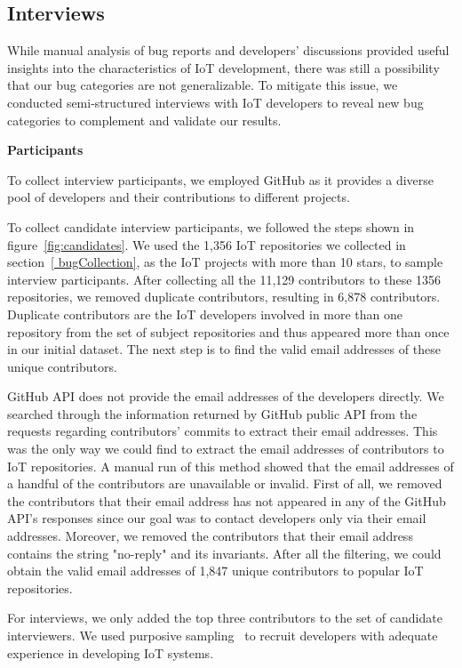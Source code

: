 \subsection{Interviews} \label{interviews4Bug}
 While manual analysis of bug reports and developers' discussions provided useful insights into the characteristics of IoT development, there was still a possibility that our bug categories are not generalizable. To mitigate this issue, we conducted semi-structured interviews with IoT developers to reveal new bug categories to complement and validate our results. 

\textbf{Participants} 

To collect interview participants, we employed GitHub as it provides a diverse pool of developers and their contributions to different projects.

To collect candidate interview participants, we followed the steps shown in figure~\autoref{fig:candidates}. We used the 1,356 IoT repositories we collected in section~\autoref{ bugCollection}, as the IoT projects with more than 10 stars, to sample interview participants. After collecting all the 11,129 contributors to these 1356 repositories, we removed duplicate contributors, resulting in 6,878 contributors. Duplicate contributors are the IoT developers involved in more than one repository from the set of subject repositories and thus appeared more than once in our initial dataset. The next step is to find the valid email addresses of these unique contributors.


GitHub API does not provide the email addresses of the developers directly. We searched through the information returned by GitHub public API from the requests regarding contributors' commits to extract their email addresses. This was the only way we could find to extract the email addresses of contributors to IoT repositories.  A manual run of this method showed that the email addresses of a handful of the contributors are unavailable or invalid. First of all, we removed the contributors that their email address has not appeared in any of the GitHub API's responses since our goal was to contact developers only via their email addresses. Moreover, we removed the contributors that their email address contains the string "no-reply" and its invariants. After all the filtering, we could obtain the valid email addresses of 1,847 unique contributors to popular IoT repositories.

For interviews, we only added the top three contributors to the set of candidate interviewers. We used purposive sampling~\cite{sampling2007} to recruit developers with adequate experience in developing IoT systems.  

